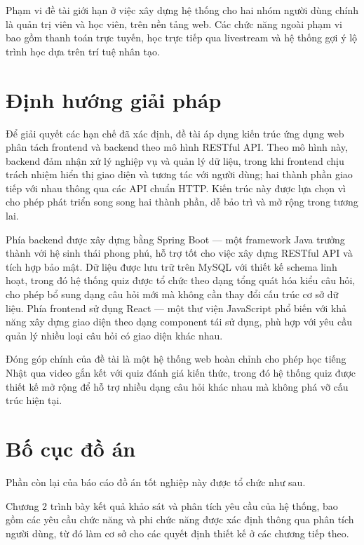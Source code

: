\documentclass[../DoAn.tex]{subfiles}
\begin{document}
Phạm vi đề tài giới hạn ở việc xây dựng hệ thống cho hai nhóm người dùng chính là quản trị viên và học viên, trên nền tảng web. Các chức năng ngoài phạm vi bao gồm thanh toán trực tuyến, học trực tiếp qua livestream và hệ thống gợi ý lộ trình học dựa trên trí tuệ nhân tạo.

\section{Định hướng giải pháp}
\label{section:1.3}

Để giải quyết các hạn chế đã xác định, đề tài áp dụng kiến trúc ứng dụng web phân tách frontend và backend theo mô hình RESTful API. Theo mô hình này, backend đảm nhận xử lý nghiệp vụ và quản lý dữ liệu, trong khi frontend chịu trách nhiệm hiển thị giao diện và tương tác với người dùng; hai thành phần giao tiếp với nhau thông qua các API chuẩn HTTP. Kiến trúc này được lựa chọn vì cho phép phát triển song song hai thành phần, dễ bảo trì và mở rộng trong tương lai.

Phía backend được xây dựng bằng Spring Boot — một framework Java trưởng thành với hệ sinh thái phong phú, hỗ trợ tốt cho việc xây dựng RESTful API và tích hợp bảo mật. Dữ liệu được lưu trữ trên MySQL với thiết kế schema linh hoạt, trong đó hệ thống quiz được tổ chức theo dạng tổng quát hóa kiểu câu hỏi, cho phép bổ sung dạng câu hỏi mới mà không cần thay đổi cấu trúc cơ sở dữ liệu. Phía frontend sử dụng React — một thư viện JavaScript phổ biến với khả năng xây dựng giao diện theo dạng component tái sử dụng, phù hợp với yêu cầu quản lý nhiều loại câu hỏi có giao diện khác nhau.

Đóng góp chính của đề tài là một hệ thống web hoàn chỉnh cho phép học tiếng Nhật qua video gắn kết với quiz đánh giá kiến thức, trong đó hệ thống quiz được thiết kế mở rộng để hỗ trợ nhiều dạng câu hỏi khác nhau mà không phá vỡ cấu trúc hiện tại.

\section{Bố cục đồ án}
\label{section:1.4}

Phần còn lại của báo cáo đồ án tốt nghiệp này được tổ chức như sau.

Chương 2 trình bày kết quả khảo sát và phân tích yêu cầu của hệ thống, bao gồm các yêu cầu chức năng và phi chức năng được xác định thông qua phân tích người dùng, từ đó làm cơ sở cho các quyết định thiết kế ở các chương tiếp theo.
\end{document}
